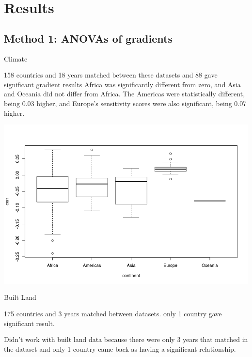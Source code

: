 \documentclass[11pt, a4paper, titlepage]{article}
\begin{document}
	

	
	
	
		
	 
	
	
	

	\clearpage

	\section*{Results}
	 
	\subsection*{Method 1: ANOVAs of gradients}
	
	Climate \newline
	
	158 countries and 18 years matched between these datasets and 88 gave significant gradient results \newline
	Africa was significantly different from zero, and Asia and Oceania did not differ from Africa. The Americas were statistically different, being 0.03 higher, and Europe's sensitivity scores were also significant, being 0.07 higher. 
	
	\includegraphics[scale=0.75]{images/SensitivityScoresClimate.png}
	
	Built Land \newline
	
	175 countries and 3 years matched between datasets. only 1 country gave significant result.
	
	Didn't work with built land data because there were only 3 years that matched in the dataset and only 1 country came back as having a significant relationship. \newline
	
\end{document}
